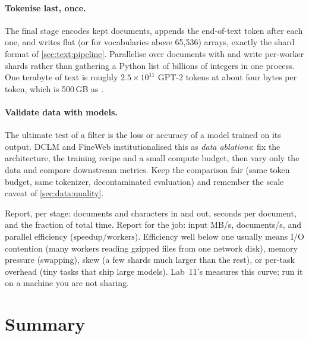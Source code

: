 \paragraph{Tokenise last, once.} The final stage encodes kept documents, appends the
end-of-text token after each one, and writes flat  (or  for vocabularies
above 65{,}536) arrays, exactly the shard format of \cref{sec:text:pipeline}. Parallelise over
documents with  and write per-worker shards rather than
gathering a Python list of billions of integers in one process. One terabyte of text is roughly
$2.5\times10^{11}$ GPT-2 tokens at about four bytes per token, which is 500\,GB as .

\paragraph{Validate data with models.} The ultimate test of a filter is the loss or accuracy of a
model trained on its output. DCLM and FineWeb institutionalised this as \emph{data ablations}:
fix the architecture, the training recipe and a small compute budget, then vary only the data
and compare downstream metrics. Keep the comparison fair (same token budget, same
tokenizer, decontaminated evaluation) and remember the scale caveat of \cref{sec:data:quality}.

\begin{systemslens}
Report, per stage: documents and characters in and out, seconds per document, and the fraction of
total time. Report for the job: input MB/s, documents/s, and parallel efficiency
($\text{speedup}/\text{workers}$). Efficiency well below one usually means I/O contention (many
workers reading gzipped files from one network disk), memory pressure (swapping), skew (a few
shards much larger than the rest), or per-task overhead (tiny tasks that ship large models). Lab~11's
 measures this curve; run it on a machine you are not sharing.
\end{systemslens}

\section{Summary}\label{sec:data:summary}

